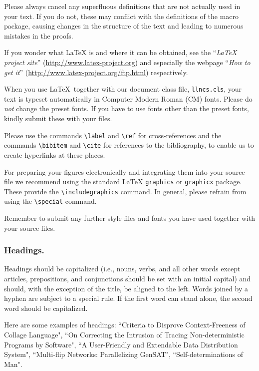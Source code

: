 \documentclass[runningheads,a4paper]{llncs}
\begin{document}
Please always cancel any superfluous definitions that are
not actually used in your text. If you do not, these may conflict with
the definitions of the macro package, causing changes in the structure
of the text and leading to numerous mistakes in the proofs.

If you wonder what \LaTeX{} is and where it can be obtained, see the
``\textit{LaTeX project site}'' (\url{http://www.latex-project.org})
and especially the webpage ``\textit{How to get it}''
(\url{http://www.latex-project.org/ftp.html}) respectively.

When you use \LaTeX\ together with our document class file,
\texttt{llncs.cls},
your text is typeset automatically in Computer Modern Roman (CM) fonts.
Please do
\emph{not} change the preset fonts. If you have to use fonts other
than the preset fonts, kindly submit these with your files.

Please use the commands \verb+\label+ and \verb+\ref+ for
cross-references and the commands \verb+\bibitem+ and \verb+\cite+ for
references to the bibliography, to enable us to create hyperlinks at
these places.

For preparing your figures electronically and integrating them into
your source file we recommend using the standard \LaTeX{} \verb+graphics+ or
\verb+graphicx+ package. These provide the \verb+\includegraphics+ command.
In general, please refrain from using the \verb+\special+ command.

Remember to submit any further style files and
fonts you have used together with your source files.

\subsubsection{Headings.}

Headings should be capitalized
(i.e., nouns, verbs, and all other words
except articles, prepositions, and conjunctions should be set with an
initial capital) and should,
with the exception of the title, be aligned to the left.
Words joined by a hyphen are subject to a special rule. If the first
word can stand alone, the second word should be capitalized.

Here are some examples of headings: ``Criteria to Disprove
Context-Freeness of Collage Language", ``On Correcting the Intrusion of
Tracing Non-deterministic Programs by Software", ``A User-Friendly and
Extendable Data Distribution System", ``Multi-flip Networks:
Parallelizing GenSAT", ``Self-determinations of Man".
\end{document}

